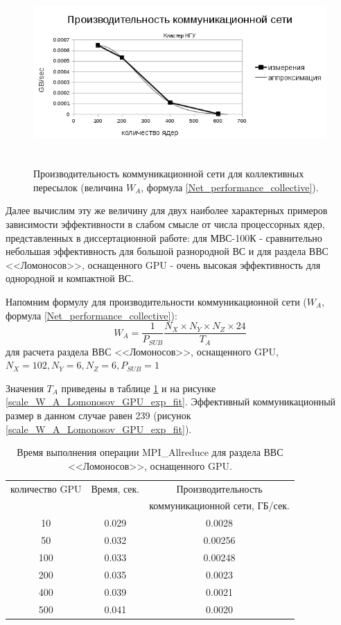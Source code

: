      
\begin{figure}[h]
	
	
	\begin{center}
		\includegraphics[height=7cm,keepaspectratio]{images/scaleNSU_exp_fit.png}
		\caption{
			Производительность коммуникационной сети для коллективных пересылок (величина $W_A$, формула \ref{Net_performance_collective}). 
		}
		\label{scale_W_A_exp}
	\end{center} 
\end{figure}

Далее вычислим эту же величину для двух наиболее характерных примеров зависимости эффективности в слабом смысле от числа процессорных ядер, представленных в диссертационной работе: для МВС-100К - сравнительно небольшая эффективность для большой разнородной ВС и для раздела ВВС <<Ломоносов>>, оснащенного GPU - очень высокая эффективность для однородной и компактной ВС. 

Напомним формулу для производительности коммуникационной сети ($W_A$, формула \ref{Net_performance_collective}):
$$
W_A = \frac{1}{P_{SUB}}\frac{N_X\times N_Y \times N_Z \times 24}{T_A}
$$
для расчета раздела ВВС <<Ломоносов>>, оснащенного GPU, $N_X = 102, N_Y = 6, N_Z = 6, P_{SUB}  = 1$

Значения $T_A$ приведены в таблице \ref{Lomonosov_GPU_W_A} и на рисунке \ref{scale_W_A_Lomonosov_GPU_exp_fit}. Эффективный коммуникационный размер в данном случае равен 239 (рисунок \ref{scale_W_A_Lomonosov_GPU_exp_fit}).

\begin{table}[ht]
\caption{Время выполнения операции MPI\_Allreduce для раздела ВВС <<Ломоносов>>, оснащенного GPU.}
\begin{tabular}{|c|c|c|}
	\hline
количество GPU & Время, сек. & Производительность  \\
               &             & коммуникационной сети, ГБ/сек. \\\hline
 10           & 0.029       & 0.0028\\
 50           & 0.032       & 0.00256\\
 100          & 0.033       & 0.00248\\
 200          & 0.035       & 0.0023\\
 400          & 0.039       & 0.0021\\
 500          & 0.041       & 0.0020\\	
\hline
\end{tabular}
\label{Lomonosov_GPU_W_A}
\end{table} 

